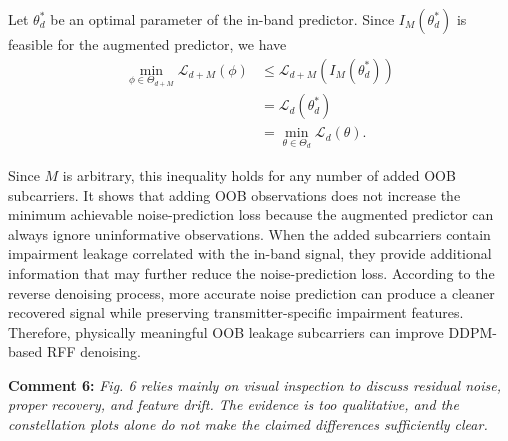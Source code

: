 \documentclass[onecolumn,11pt]{article}
\newcommand{\secc}[2]{\mySep \noindent \textsf{\textbf{#1 }}\noindent \textit{#2}}
\newcommand{\mySep}{\vspace{8pt}}
\begin{document}
{{Let $\theta_d^{*}$ be an optimal parameter of the in-band predictor.
Since $I_M(\theta_d^{*})$ is feasible for the augmented predictor, we have
\begin{equation}
\begin{aligned}
\min_{\phi\in\Theta_{d+M}}
\mathcal{L}_{d+M}(\phi)
&\leq
\mathcal{L}_{d+M}\left(I_M(\theta_d^{*})\right) \\
&=
\mathcal{L}_{d}(\theta_d^{*}) \\
&=
\min_{\theta\in\Theta_d}
\mathcal{L}_{d}(\theta).
\end{aligned}
\tag{50}
\label{eq:main_loss_inequality_theta}
\end{equation}

Since $M$ is arbitrary, this inequality holds for any number of added OOB subcarriers.
It shows that adding OOB observations does not increase the minimum achievable noise-prediction loss because the augmented predictor can always ignore uninformative observations.
When the added subcarriers contain impairment leakage correlated with the in-band signal, they provide additional information that may further reduce the noise-prediction loss.
According to the reverse denoising process, more accurate noise prediction can produce a cleaner recovered signal while preserving transmitter-specific impairment features.
Therefore, physically meaningful OOB leakage subcarriers can improve DDPM-based RFF denoising.}
}



\secc{Comment 6:}{Fig. 6 relies mainly on visual inspection to discuss residual noise, proper recovery, and feature drift. The evidence is too qualitative, and the constellation plots alone do not make the claimed differences sufficiently clear.
}
\end{document}
